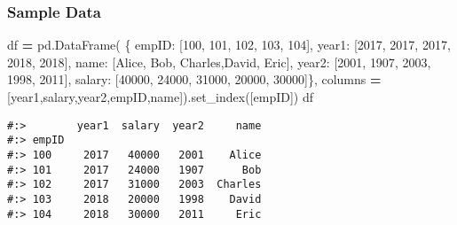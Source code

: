 \documentclass[
]{book}
\newenvironment{Shaded}{\begin{snugshade}}{\end{snugshade}}
\newcommand{\DecValTok}[1]{\textcolor[rgb]{0.06,0.06,0.06}{#1}}
\newcommand{\NormalTok}[1]{#1}
\newcommand{\OperatorTok}[1]{\textcolor[rgb]{0.43,0.43,0.43}{\textbf{#1}}}
\newcommand{\StringTok}[1]{\textcolor[rgb]{0.5,0.5,0.5}{#1}}
\begin{document}
\hypertarget{sample-data-8}{%
\subsubsection{Sample Data}\label{sample-data-8}}

\begin{Shaded}
\begin{Highlighting}[]
\NormalTok{df }\OperatorTok{=}\NormalTok{ pd.DataFrame(}
\NormalTok{    \{ }\StringTok{\textquotesingle{}empID\textquotesingle{}}\NormalTok{:  [}\DecValTok{100}\NormalTok{,      }\DecValTok{101}\NormalTok{,    }\DecValTok{102}\NormalTok{,      }\DecValTok{103}\NormalTok{,     }\DecValTok{104}\NormalTok{],}
      \StringTok{\textquotesingle{}year1\textquotesingle{}}\NormalTok{:   [}\DecValTok{2017}\NormalTok{,     }\DecValTok{2017}\NormalTok{,   }\DecValTok{2017}\NormalTok{,      }\DecValTok{2018}\NormalTok{,    }\DecValTok{2018}\NormalTok{],}
      \StringTok{\textquotesingle{}name\textquotesingle{}}\NormalTok{:   [}\StringTok{\textquotesingle{}Alice\textquotesingle{}}\NormalTok{,  }\StringTok{\textquotesingle{}Bob\textquotesingle{}}\NormalTok{,  }\StringTok{\textquotesingle{}Charles\textquotesingle{}}\NormalTok{,}\StringTok{\textquotesingle{}David\textquotesingle{}}\NormalTok{, }\StringTok{\textquotesingle{}Eric\textquotesingle{}}\NormalTok{],}
      \StringTok{\textquotesingle{}year2\textquotesingle{}}\NormalTok{:   [}\DecValTok{2001}\NormalTok{,     }\DecValTok{1907}\NormalTok{,   }\DecValTok{2003}\NormalTok{,      }\DecValTok{1998}\NormalTok{,    }\DecValTok{2011}\NormalTok{],}
      \StringTok{\textquotesingle{}salary\textquotesingle{}}\NormalTok{: [}\DecValTok{40000}\NormalTok{,    }\DecValTok{24000}\NormalTok{,  }\DecValTok{31000}\NormalTok{,     }\DecValTok{20000}\NormalTok{,   }\DecValTok{30000}\NormalTok{]\},}
\NormalTok{    columns }\OperatorTok{=}\NormalTok{ [}\StringTok{\textquotesingle{}year1\textquotesingle{}}\NormalTok{,}\StringTok{\textquotesingle{}salary\textquotesingle{}}\NormalTok{,}\StringTok{\textquotesingle{}year2\textquotesingle{}}\NormalTok{,}\StringTok{\textquotesingle{}empID\textquotesingle{}}\NormalTok{,}\StringTok{\textquotesingle{}name\textquotesingle{}}\NormalTok{]).set\_index([}\StringTok{\textquotesingle{}empID\textquotesingle{}}\NormalTok{])}
\NormalTok{df}
\end{Highlighting}
\end{Shaded}

\begin{verbatim}
#:>        year1  salary  year2     name
#:> empID                               
#:> 100     2017   40000   2001    Alice
#:> 101     2017   24000   1907      Bob
#:> 102     2017   31000   2003  Charles
#:> 103     2018   20000   1998    David
#:> 104     2018   30000   2011     Eric
\end{verbatim}
\end{document}
